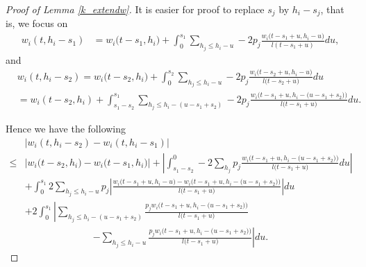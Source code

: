 \documentclass[12pt]{article}
\numberwithin{equation}{section}  %
\begin{document}
\begin{proof}[Proof of Lemma \ref{k_extendw}]
It is easier for proof to replace $s_j$ by $h_i-s_j$, that is, we focus on
\begin{align*} 
w_i(t,h_i-s_1)&= w_i\big(t-s_1,h_i\big)+\int_{0}^{s_1} \sum_{h_j\leq h_i-u} -2p_j\frac{w_i\big(t-s_1+u,h_i-u\big)}{l(t-s_1+u)}du,
\end{align*} 
and
{
\begin{align*} 
&w_i(t,h_i-s_2)= w_i\big(t-s_2,h_i\big)+\int_{0}^{s_2} \sum_{h_j\leq h_i-u} -2p_j\frac{w_i\big(t-s_2+u,h_i-u\big)}{l\big(t-s_2+u\big)}du\\
&=w_i(t-s_2,h_i)+\int_{s_1-s_2}^{s_1} \sum_{h_j\leq h_i-(u-s_1+s_2)} -2p_j\frac{w_i\big(t-s_1+u,h_i-\big(u-s_1+s_2\big)\big)}{l\big(t-s_1+u\big)} du.
\end{align*} }

Hence we have the following
{
\begin{align} 
&\left|w_i(t,h_i-s_2)-w_i(t,h_i-s_1)\right|\nonumber\\
\leq& \left|w_i\big(t-s_2,h_i\big)- w_i\big(t-s_1,h_i\big)\right|
+\left|\int_{s_1-s_2}^0-2\sum_{h_j} p_j\frac{w_i\big(t-s_1+u,h_i-\big(u-s_1+s_2\big)\big)}{l\big(t-s_1+u\big)}du\right|\nonumber\\
&+\int_{0}^{s_1}2\sum_{h_j\leq h_i-u}p_j \left|\frac{w_i\big(t-s_1+u,h_i-u\big)-w_i\big(t-s_1+u,h_i-\big(u-s_1+s_2\big)\big)}{l\big(t-s_1+u\big)}\right|du\nonumber\\
&+2\int_{0}^{s_1} 
\left|
\sum_{h_j\leq h_i-(u-s_1+s_2)} \frac{p_j w_i\big(t-s_1+u,h_i-\big(u-s_1+s_2\big)\big)}{l\big(t-s_1+u\big)} \right.\nonumber\\
&\quad\quad\quad\quad\quad\quad\quad\left.-\sum_{h_j\leq h_i-u} \frac{p_j w_i\big(t-s_1+u,h_i-\big(u-s_1+s_2\big)\big)}{l\big(t-s_1+u\big)} 
\right|du .
\label{kpw_12_0}
\end{align} }



\end{proof}
\end{document}
